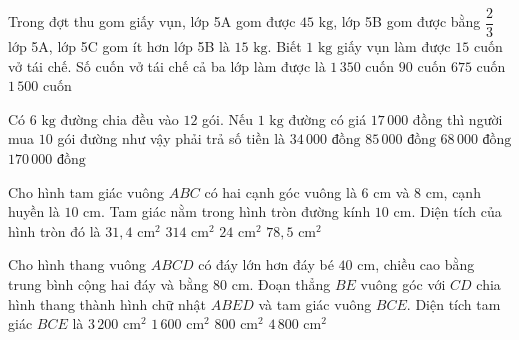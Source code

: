 \begin{ex} %
Trong đợt thu gom giấy vụn, lớp 5A gom được $45\text{ kg}$, lớp 5B gom được bằng $\dfrac{2}{3}$ lớp 5A, lớp 5C gom ít hơn lớp 5B là $15\text{ kg}$. Biết $1\text{ kg}$ giấy vụn làm được $15$ cuốn vở tái chế. Số cuốn vở tái chế cả ba lớp làm được là
\choice
{\True $1\,350$ cuốn}
{$90$ cuốn}
{$675$ cuốn}
{$1\,500$ cuốn}
\end{ex}

\begin{ex} %
Có $6\text{ kg}$ đường chia đều vào $12$ gói. Nếu $1\text{ kg}$ đường có giá $17\,000$ đồng thì người mua $10$ gói đường như vậy phải trả số tiền là
\choice
{$34\,000\text{ đồng}$}
{\True $85\,000\text{ đồng}$}
{$68\,000\text{ đồng}$}
{$170\,000\text{ đồng}$}
\end{ex}

\begin{ex} %
Cho hình tam giác vuông $ABC$ có hai cạnh góc vuông là $6\text{ cm}$ và $8\text{ cm}$, cạnh huyền là $10\text{ cm}$. Tam giác nằm trong hình tròn đường kính $10\text{ cm}$. Diện tích của hình tròn đó là
\choice
{$31{,}4\text{ cm}^2$}
{$314\text{ cm}^2$}
{$24\text{ cm}^2$}
{\True $78{,}5\text{ cm}^2$}
\end{ex}

\begin{ex} %
Cho hình thang vuông $ABCD$ có đáy lớn hơn đáy bé $40\text{ cm}$, chiều cao bằng trung bình cộng hai đáy và bằng $80\text{ cm}$. Đoạn thẳng $BE$ vuông góc với $CD$ chia hình thang thành hình chữ nhật $ABED$ và tam giác vuông $BCE$. Diện tích tam giác $BCE$ là
\choice
{$3\,200\text{ cm}^2$}
{\True $1\,600\text{ cm}^2$}
{$800\text{ cm}^2$}
{$4\,800\text{ cm}^2$}
\end{ex}

